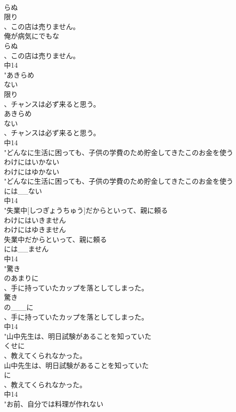 \documentclass[8pt]{extreport}
\begin{document}
\begin{CJK}{UTF8}{min}
\\	らぬ
\\	限り
\\	、この店は売りません。
\\	俺が病気にでもな
\\	らぬ
\\	、この店は売りません。
\\	中14
\\	"あきらめ
\\	ない
\\	限り
\\	、チャンスは必ず来ると思う。
\\	あきらめ
\\	ない
\\	、チャンスは必ず来ると思う。
\\	中14
\\	"どんなに生活に困っても、子供の学費のため貯金してきたこのお金を使う
\\	わけにはいかない
\\	わけにはゆかない
\\	"どんなに生活に困っても、子供の学費のため貯金してきたこのお金を使う
\\	には__ない
\\	中14
\\	"失業中[しつぎょうちゅう]だからといって、親に頼る
\\	わけにはいきません
\\	わけにはゆきません
\\	失業中だからといって、親に頼る
\\	には__ません
\\	中14
\\	"驚き
\\	のあまりに
\\	、手に持っていたカップを落としてしまった。
\\	驚き
\\	の___に
\\	、手に持っていたカップを落としてしまった。
\\	中14
\\	"山中先生は、明日試験があることを知っていた
\\	くせに
\\	、教えてくられなかった。
\\	山中先生は、明日試験があることを知っていた
\\	に
\\	、教えてくられなかった。
\\	中14
\\	"お前、自分では料理が作れない

\end{CJK}
\end{document}
